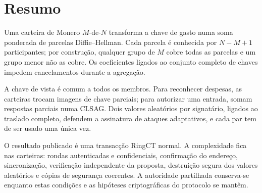 \section{Resumo}

Uma carteira de Monero \(M\)-de-\(N\) transforma a chave de gasto numa soma
ponderada de parcelas Diffie--Hellman. Cada parcela é conhecida por
\(N-M+1\) participantes; por construção, qualquer grupo de \(M\) cobre todas
as parcelas e um grupo menor não as cobre. Os coeficientes ligados ao conjunto
completo de chaves impedem cancelamentos durante a agregação.

A chave de vista é comum a todos os membros. Para reconhecer despesas, as
carteiras trocam imagens de chave parciais; para autorizar uma entrada, somam
respostas parciais numa CLSAG. Dois valores aleatórios por signatário, ligados
ao traslado completo, defendem a assinatura de ataques adaptativos, e cada par
tem de ser usado uma única vez.

O resultado publicado é uma transacção RingCT normal. A complexidade fica nas
carteiras: rondas autenticadas e confidenciais, confirmação do endereço,
sincronização, verificação independente da proposta, destruição segura dos
valores aleatórios e cópias de segurança coerentes. A autoridade partilhada
conserva-se enquanto estas condições e as hipóteses criptográficas do
protocolo se mantêm.
